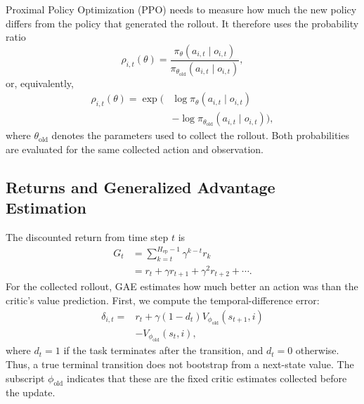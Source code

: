 \documentclass[letterpaper,10pt,conference]{ieeeconf}
\begin{document}
Proximal Policy Optimization (PPO) needs to measure how much the new policy
differs from the policy that generated the rollout. It therefore uses the
probability ratio
\begin{equation}
    \rho_{i,t}(\theta)
    = \frac{\pi_\theta(a_{i,t}\mid o_{i,t})}
            {\pi_{\theta_{\mathrm{old}}}(a_{i,t}\mid o_{i,t})},
    \label{eq:probability-ratio}
\end{equation}
or, equivalently,
\begin{equation}
\begin{aligned}
    \rho_{i,t}(\theta)
    = \exp\!\bigl(&\log\pi_\theta(a_{i,t}\mid o_{i,t})\\
                 &-\log\pi_{\theta_{\mathrm{old}}}(a_{i,t}\mid o_{i,t})\bigr),
\end{aligned}
\end{equation}
where $\theta_{\mathrm{old}}$ denotes the parameters used to collect the
rollout. Both probabilities are evaluated for the same collected action
and observation.

\subsection{Returns and Generalized Advantage Estimation}

The discounted return from time step $t$ is
\begin{equation}
\begin{aligned}
    G_t
    &= \sum_{k=t}^{H_{\mathrm{ep}}-1}\gamma^{k-t}r_k\\
    &= r_t + \gamma r_{t+1} + \gamma^2 r_{t+2} + \cdots.
\end{aligned}
    \label{eq:discounted-return}
\end{equation}
For the collected rollout, GAE estimates how much better an action was
than the critic's value prediction. First, we compute the temporal-difference
error:
\begin{equation}
\begin{aligned}
    \delta_{i,t}
    ={}& r_t + \gamma(1-d_t)V_{\phi_{\mathrm{old}}}(s_{t+1},i)\\
       &-V_{\phi_{\mathrm{old}}}(s_t,i),
\end{aligned}
    \label{eq:td-error}
\end{equation}
where $d_t=1$ if the task terminates after the transition, and $d_t=0$
otherwise. Thus, a true terminal transition does not bootstrap from a
next-state value. The subscript $\phi_{\mathrm{old}}$ indicates that
these are the fixed critic estimates collected before the update.
\end{document}
